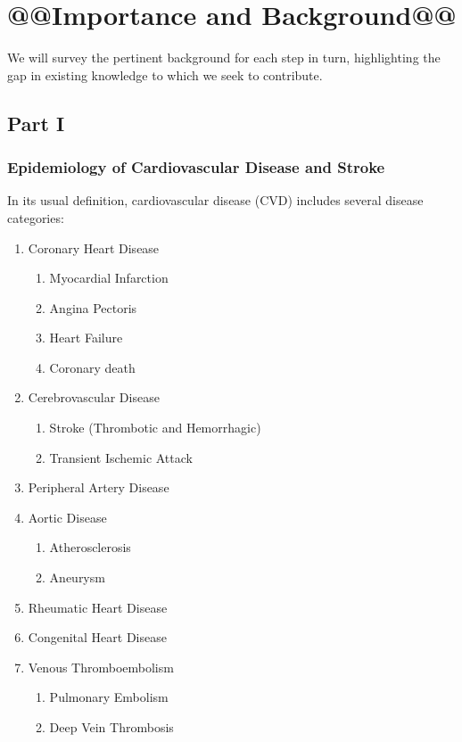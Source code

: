 \documentclass[a4paper,12pt]{article}
\begin{document}
	\section{@@Importance and Background@@}
	
	We will survey the pertinent background for each step in turn, highlighting the gap in existing knowledge to which we seek to contribute.
	
		\subsection{Part I}
		
			\subsubsection{Epidemiology of Cardiovascular Disease and Stroke}
			
			In its usual definition, cardiovascular disease (CVD) includes several disease categories\cite{WHO2017}:
			\begin{enumerate}
				\item Coronary Heart Disease
				\begin{enumerate}
					\item Myocardial Infarction
					\item Angina Pectoris
					\item Heart Failure
					\item Coronary death
				\end{enumerate}
				\item Cerebrovascular Disease
				\begin{enumerate}
					\item Stroke (Thrombotic and Hemorrhagic)
					\item Transient Ischemic Attack
				\end{enumerate}
				\item Peripheral Artery Disease
				\item Aortic Disease
				\begin{enumerate}
					\item Atherosclerosis
					\item Aneurysm
				\end{enumerate}
				\item Rheumatic Heart Disease
				\item Congenital Heart Disease
				\item Venous Thromboembolism
				\begin{enumerate}
					\item Pulmonary Embolism
					\item Deep Vein Thrombosis
				\end{enumerate}
			\end{enumerate}
		
\end{document}

